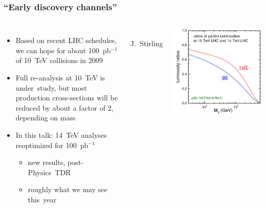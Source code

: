 \documentclass[compress]{beamer}
\begin{document}
\begin{frame}
\frametitle{``Early discovery channels''}

\begin{columns}

\vspace{-1 cm}
\begin{itemize}
\item Based on recent LHC schedules, we can hope for about
  100~pb$^{-1}$ of 10~TeV collisions in 2009
\item Full re-analysis at 10~TeV is \mbox{under study,\hspace{-0.5 cm}} but most production
  cross-sections will be reduced by about a factor of 2, depending on
  mass
\item In this talk: 14~TeV analyses reoptimized for 100~pb$^{-1}$
\begin{itemize}
\item new results, \mbox{post-Physics TDR\hspace{-1 cm}}
\item roughly what we may see \mbox{this year\hspace{-1 cm}}
\end{itemize}
\end{itemize}

\vspace{0.5 cm}
\mbox{ } \hfill \hfill J.\ Stirling \hfill \mbox{ }

\includegraphics[width=\linewidth]{sterling_plot.png}
\end{columns}


\end{frame}
\end{document}
